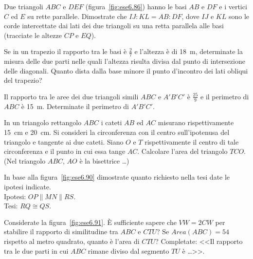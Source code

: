 \begin{multicols}{2}
\begin{esercizio}
\label{ese:6.86}
Due triangoli $ABC$ e $DEF$ (figura~\ref{fig:ese6.86}) hanno le basi $AB$ e $DF$ e i vertici $C$ ed $E$ su rette parallele. Dimostrate che $IJ:KL=AB:DF$, dove $IJ$ e $KL$ sono le corde intercettate dai lati dei due triangoli su una retta parallela alle basi (tracciate le altezze $CP$ e $EQ$).
\end{esercizio}

\begin{esercizio}
\label{ese:6.87}
Se in un trapezio il rapporto tra le basi è $\frac{2}{7}$ e l'altezza è di 18~m, determinate la misura delle due parti nelle quali l'altezza risulta divisa dal punto di intersezione delle diagonali. Quanto dista dalla base minore il punto d'incontro dei lati obliqui del trapezio?
\end{esercizio}

\begin{esercizio}
\label{ese:6.88}
Il rapporto tra le aree dei due triangoli simili $ABC$ e $A'B'C'$ è $\frac{25}{9}$ e il perimetro di $ABC$ è 15~m. Determinate il perimetro di $A'B'C'$.
\end{esercizio}

\begin{esercizio}
\label{ese:6.89}
In un triangolo rettangolo $ABC$ i cateti $AB$ ed $AC$ misurano rispettivamente 15~cm e 20~cm. Si consideri la circonferenza con il centro sull'ipotenusa del triangolo e tangente ai due cateti. Siano $O$ e $T$ rispettivamente il centro di tale circonferenza e il punto in cui essa tange $AC$. Calcolare l'area del triangolo $TCO$. (Nel triangolo $ABC$, $AO$ è la bisettrice \ldots)
\end{esercizio}

\begin{esercizio}
\label{ese:6.90}
In base alla figura~\ref{fig:ese6.90} dimostrate quanto richiesto nella tesi date le ipotesi indicate.\\
Ipotesi: $OP\parallel MN\parallel RS$.\\
Tesi: $RQ\cong QS$.
\end{esercizio}

\begin{esercizio}
\label{ese:6.91}
Considerate la figura~\ref{fig:ese6.91}. \`E sufficiente sapere che $VW=2CW$ per stabilire il rapporto di similitudine tra $ABC$ e $CTU$? Se $Area(ABC) = 54$ rispetto al metro quadrato, quanto è l'area di $CTU$? Completate: <<Il rapporto tra le due parti in cui $ABC$ rimane diviso dal segmento $TU$ è \ldots{}>>.
\end{esercizio}


\end{multicols}

